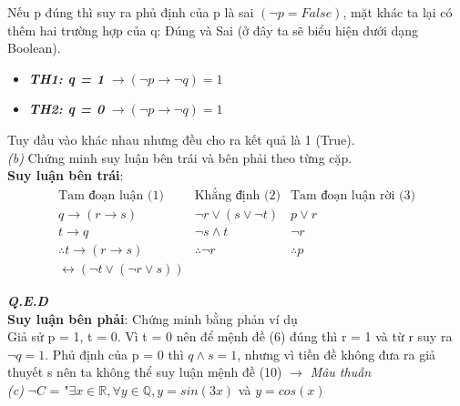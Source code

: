 \documentclass[a4paper]{exam}
\begin{document}
	Nếu p đúng thì suy ra phủ định của p là sai $(\neg p = False)$, mặt khác ta lại có thêm hai trường hợp của q: Đúng và Sai (ở đây ta sẽ biểu hiện dưới dạng Boolean).
	
	\begin{itemize}
		\item \textbf{\textit{TH1: q = 1}} $ \longrightarrow (\neg p \longrightarrow \neg q) = 1$ 
		\item \textbf{\textit{TH2: q = 0}} $ \longrightarrow (\neg p \longrightarrow \neg q) = 1$ 
	\end{itemize}
	
	Tuy đầu vào khác nhau nhưng đều cho ra kết quả là 1 (True).\\
	
	\textit{(b)} Chứng minh suy luận bên trái và bên phải theo từng cặp.\\
	
	\textbf{Suy luận bên trái}:\\
	
	\[
	\begin{array}{c|c|c}
		\text{Tam đoạn luận (1)}                               & \text{Khẳng định (2)}           & \text{Tam đoạn luận rời (3)} \\ \hline
		q \longrightarrow (r \longrightarrow s)            & \neg r \lor (s \lor \neg t) & p \lor r                 \\
		t \longrightarrow q                                & \neg s \land t              & \neg r                   \\ \hline
		\therefore t \longrightarrow (r \longrightarrow s) & \therefore \neg r           & \therefore p                        \\
		\longleftrightarrow (\neg t \lor (\neg r \lor s))  &                             &
	\end{array}
	\]
	
	\hspace*{0pt}\hfill \textit{\textbf{Q.E.D}}\\
	
	\textbf{Suy luận bên phải}: Chứng minh bằng phản ví dụ\\
	
	Giả sử p = 1, t = 0. Vì t = 0 nên để mệnh đề (6) đúng thì r = 1 và từ r suy ra $\neg q = 1$. Phủ định của p = 0 thì $q \land s = 1$, nhưng vì tiền đề không đưa ra giả thuyết s nên ta không thể suy luận mệnh đề (10) $\longrightarrow$ \textit{Mâu thuẫn}\\
	
	\textit{(c)} $\neg C$ = "$\exists x \in \mathbb{R}, \forall y \in \mathbb{Q}, y = sin(3x)$ và $y = cos(x)$\\
	
\end{document}
